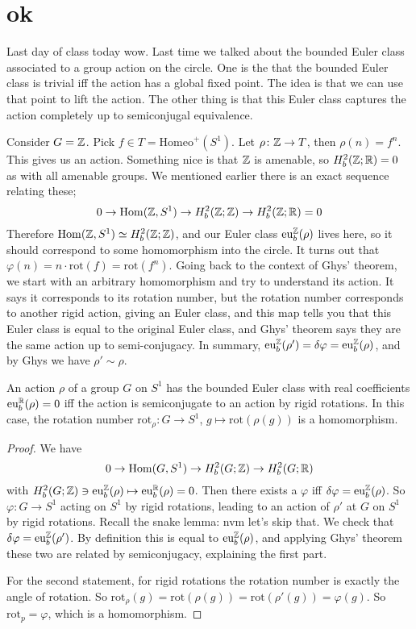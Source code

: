 \section{ok} 
Last day of class today wow. Last time we talked about the bounded Euler class associated to a group action on the circle. One is the that the bounded Euler class is trivial iff the action has a global fixed point. The idea is that we can use that point to lift the action. The other thing is that this Euler class captures the action completely up to semiconjugal equivalence. 
\begin{example}
    Consider $G=\mathbb{Z}$. Pick $f \in T = \mathrm{Homeo}^+(S^1 )$. Let $\rho \colon \mathbb{Z} \to T$, then $\rho(n)=f^n $. This gives us an action. Something nice is that $\mathbb{Z}$ is amenable, so $H^2_b(\mathbb{Z} ;\mathbb{R})=0$ as with all amenable groups. We mentioned earlier there is an exact sequence relating these; \[
        0 \to \operatorname{Hom}(\mathbb{Z},S^1 ) \to H^2_b(\mathbb{Z};\mathbb{Z}) \to  H^2_b(\mathbb{Z};\mathbb{R})=0
    \] Therefore $\operatorname{Hom}(\mathbb{Z},S^1 ) \simeq H^2_b(\mathbb{Z};\mathbb{Z})$, and our Euler class $\mathrm{eu}_b^{\mathbb{Z}}(\rho)$ lives here, so it should correspond to some homomorphism into the circle. It turns out that $\varphi (n)=n \cdot  \mathrm{rot}(f)= \mathrm{rot}(f^n )$. Going back to the context of Ghys' theorem, we start with an arbitrary homomorphism and try to understand its action. It says it corresponds to its rotation number, but the rotation number corresponds to another rigid action, giving an Euler class, and this map tells you that this Euler class is equal to the original Euler class, and Ghys' theorem says they are the same action up to semi-conjugacy. In summary, $\mathrm{eu}_b ^{\mathbb{Z}}(\rho')= \delta \varphi =\mathrm{eu}^{\mathbb{Z}}_b(\rho)$, and by Ghys we have $\rho'\sim \rho$.
\end{example}
\begin{prop}
    An action $\rho$ of a group $G$ on $S^1 $ has the bounded Euler class with real coefficients $\mathrm{eu}_b^{\mathbb{R}}(\rho)=0$ iff the action is semiconjugate to an action by rigid rotations. In this case, the rotation number $\mathrm{rot}_{\rho} \colon G \to S^1 $, $g \mapsto  \mathrm{rot}(\rho(g))$ is a homomorphism.
\end{prop}
\begin{proof}
    We have \[
        0 \to \operatorname{Hom}(G,S^1 ) \to H^2_b(G ;\mathbb{Z}) \to  H^2_b(G;\mathbb{R})
    \] with $H^2_b(G;\mathbb{Z})\ni\mathrm{eu}_b ^{\mathbb{Z}}(\rho) \mapsto  \mathrm{eu}_b ^{\mathbb{R}}(\rho)=0$. Then there exists a $\varphi $ iff $\delta \varphi =\mathrm{eu}_b ^{\mathbb{Z}}(\rho)$.  So $\varphi  \colon G \to S^1  $ acting on $S^1 $ by rigid rotations, leading to an action of $\rho'$ at $G$ on $S^1 $ by rigid rotations. Recall the snake lemma: nvm let's skip that. We check that $\delta \varphi  = \mathrm{eu}_b ^{\mathbb{Z}}(\rho')$. By definition this is equal to $\mathrm{eu}_b ^{\mathbb{Z}}(\rho)$, and applying Ghys' theorem these two are related by semiconjugacy, explaining the first part.

    For the second statement, for rigid rotations the rotation number is exactly the angle of rotation. So $\mathrm{rot}_\rho(g)= \mathrm{rot}(\rho(g))= \mathrm{rot}(\rho'(g))=\varphi (g)$. So $\mathrm{rot}_p=\varphi $, which is a homomorphism.
\end{proof}
